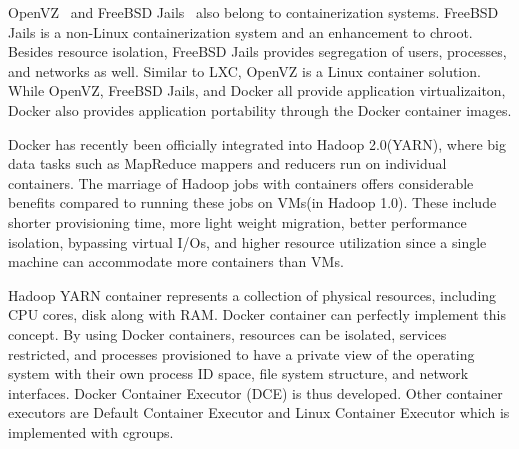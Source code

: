OpenVZ~\cite{openvz} and FreeBSD Jails~\cite{jails} also belong to containerization systems. FreeBSD Jails is a non-Linux containerization system and an enhancement to chroot. Besides resource isolation, FreeBSD Jails provides segregation of users, processes, and networks as well. Similar to LXC, OpenVZ is a Linux container solution. While OpenVZ, FreeBSD Jails, and Docker all provide application virtualizaiton, Docker also provides application portability through the Docker container images.

Docker has recently been officially integrated into Hadoop 2.0(YARN), where big data tasks such as MapReduce mappers and reducers run on individual containers. The marriage of Hadoop jobs with containers offers considerable benefits compared to running these jobs on VMs(in Hadoop 1.0). These include shorter provisioning time, more light weight migration, better performance isolation, bypassing virtual I/Os, and higher resource utilization since a single machine can accommodate more containers than VMs. 

Hadoop YARN container represents a collection of physical resources, including CPU cores, disk along with RAM. Docker container can perfectly implement this concept. By using Docker containers, resources can be isolated, services restricted, and processes provisioned to have a private view of the operating system with their own process ID space, file system structure, and network interfaces. Docker Container Executor (DCE) is thus developed. Other container executors are Default Container Executor and Linux Container Executor which is implemented with cgroups.


